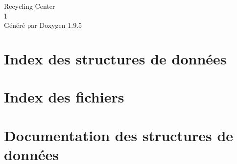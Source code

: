 \documentclass[twoside]{book}
\newcommand{\+}{\discretionary{\mbox{\scriptsize$\hookleftarrow$}}{}{}}
\newcommand{\clearemptydoublepage}{%
    \newpage{\pagestyle{empty}\cleardoublepage}%
  }
\begin{document}
  \raggedbottom
    \hypersetup{pageanchor=false,
                bookmarksnumbered=true,
                pdfencoding=unicode
               }
  \begin{titlepage}
  \vspace*{7cm}
  \begin{center}%
  {\Large Recycling Center}\\
  [1ex]\large 1 \\
  \vspace*{1cm}
  {\large Généré par Doxygen 1.9.5}\\
  \end{center}
  \end{titlepage}
  \clearemptydoublepage
  \tableofcontents
  \clearemptydoublepage
  \hypersetup{pageanchor=true}
\chapter{Index des structures de données}

\chapter{Index des fichiers}

\chapter{Documentation des structures de données}











\end{document}
